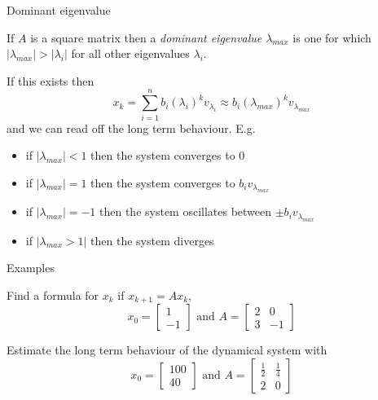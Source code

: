 \documentclass{beamer}
\begin{document}
\begin{frame}{Dominant eigenvalue}
\begin{definition}
	If $A$ is a square matrix then a \emph{dominant eigenvalue $\lambda_{max}$} is one for which $|\lambda_{max}|>|\lambda_i|$ for all other eigenvalues $\lambda_i$.
\end{definition}
If this exists then
\begin{equation*}
x_k = \sum_{i=1}^n b_i (\lambda_i)^k v_{\lambda_i} \approx b_i (\lambda_{max})^k v_{\lambda_{max}}
\end{equation*}
and we can read off the long term behaviour. E.g.
\begin{itemize}
	\item if $|\lambda_{max}|< 1$ then the system converges to $0$
	\item if $|\lambda_{max}| = 1$ then the system converges to $b_iv_{\lambda_{max}}$
	\item if $|\lambda_{max}| = -1$ then the system oscillates between $\pm b_iv_{\lambda_{max}}$
	\item if $|\lambda_{max}>1|$ then the system diverges
\end{itemize}
\end{frame}

\begin{frame}{Examples}
\begin{example}
	Find a formula for $x_k$ if $x_{k+1} = Ax_k$,
	\begin{equation*}
	x_0 = \left[
	\begin{matrix}
	1\\
	-1
	\end{matrix}
	\right] \text{ and } A = \left[
	\begin{matrix}
	2&0\\
	3&-1
	\end{matrix}
	\right]
	\end{equation*}
\end{example}
\begin{example}
	Estimate the long term behaviour of the dynamical system with
	\begin{equation*}
	x_0 = \left[
	\begin{matrix}
	100\\
	40
	\end{matrix}
	\right] \text{ and }
	A = \left[
	\begin{matrix}
	\frac{1}{2}&\frac{1}{4}\\
	2&0
	\end{matrix}
	\right]
	\end{equation*}

\end{example}
\end{frame}
\end{document}
